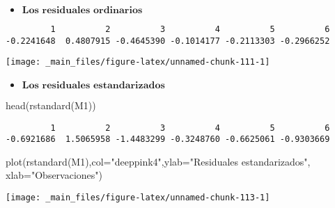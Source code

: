 \documentclass[
  a4paper,
  oneside,
  openany]{book}
\newenvironment{Shaded}{\begin{snugshade}}{\end{snugshade}}
\newcommand{\AttributeTok}[1]{\textcolor[rgb]{0.77,0.63,0.00}{#1}}
\newcommand{\FunctionTok}[1]{\textcolor[rgb]{0.00,0.00,0.00}{#1}}
\newcommand{\NormalTok}[1]{#1}
\newcommand{\SpecialCharTok}[1]{\textcolor[rgb]{0.00,0.00,0.00}{#1}}
\newcommand{\StringTok}[1]{\textcolor[rgb]{0.31,0.60,0.02}{#1}}
\providecommand{\tightlist}{%
  \setlength{\itemsep}{0pt}\setlength{\parskip}{0pt}}
\begin{document}
\begin{itemize}
\tightlist
\item
  \(\textbf{Los residuales ordinarios}\)
\end{itemize}

\begin{Shaded}
\end{Shaded}

\begin{verbatim}
         1          2          3          4          5          6 
-0.2241648  0.4807915 -0.4645390 -0.1014177 -0.2113303 -0.2966252 
\end{verbatim}

\begin{center}\texttt{[image: \_main\_files/figure-latex/unnamed-chunk-111-1]} \end{center}

\begin{itemize}
\tightlist
\item
  \(\textbf{Los residuales estandarizados}\)
\end{itemize}

\begin{Shaded}
\begin{Highlighting}[]
\FunctionTok{head}\NormalTok{(}\FunctionTok{rstandard}\NormalTok{(M1))}
\end{Highlighting}
\end{Shaded}

\begin{verbatim}
         1          2          3          4          5          6 
-0.6921686  1.5065958 -1.4483299 -0.3248760 -0.6625061 -0.9303669 
\end{verbatim}

\begin{Shaded}
\begin{Highlighting}[]
\FunctionTok{plot}\NormalTok{(}\FunctionTok{rstandard}\NormalTok{(M1),}\AttributeTok{col=}\StringTok{"deeppink4"}\NormalTok{,}\AttributeTok{ylab=}\StringTok{"Residuales estandarizados"}\NormalTok{, }\AttributeTok{xlab=}\StringTok{"Observaciones"}\NormalTok{)}
\end{Highlighting}
\end{Shaded}

\begin{center}\texttt{[image: \_main\_files/figure-latex/unnamed-chunk-113-1]} \end{center}
\end{document}
